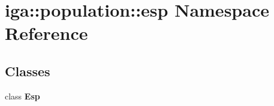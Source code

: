\section{iga::population::esp Namespace Reference}
\label{namespaceiga_1_1population_1_1esp}


\subsection*{Classes}
\begin{CompactItemize}
\item 
class {\bf Esp}
\end{CompactItemize}
